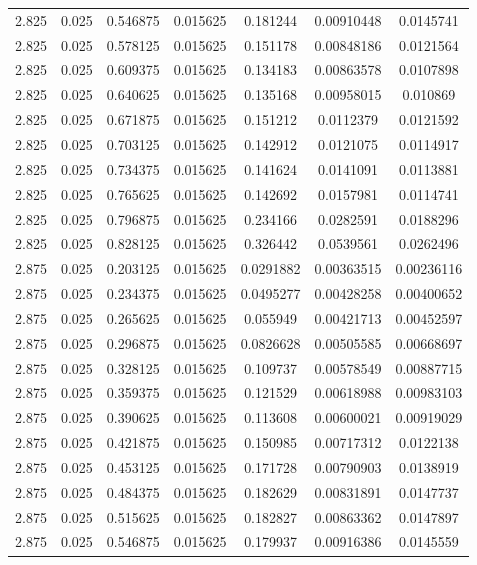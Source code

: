 \begin{table}[bh]
\begin{center}
{\begin{tabular}{ccccccc}
2.825	 & 0.025 & 	0.546875	 & 0.015625	 & 0.181244	 & 0.00910448	 & 0.0145741 \\ 
2.825	 & 0.025 & 	0.578125	 & 0.015625	 & 0.151178	 & 0.00848186	 & 0.0121564 \\ 
2.825	 & 0.025 & 	0.609375	 & 0.015625	 & 0.134183	 & 0.00863578	 & 0.0107898 \\ 
2.825	 & 0.025 & 	0.640625	 & 0.015625	 & 0.135168	 & 0.00958015	 & 0.010869 \\ 
2.825	 & 0.025 & 	0.671875	 & 0.015625	 & 0.151212	 & 0.0112379	 & 0.0121592 \\ 
2.825	 & 0.025 & 	0.703125	 & 0.015625	 & 0.142912	 & 0.0121075	 & 0.0114917 \\ 
2.825	 & 0.025 & 	0.734375	 & 0.015625	 & 0.141624	 & 0.0141091	 & 0.0113881 \\ 
2.825	 & 0.025 & 	0.765625	 & 0.015625	 & 0.142692	 & 0.0157981	 & 0.0114741 \\ 
2.825	 & 0.025 & 	0.796875	 & 0.015625	 & 0.234166	 & 0.0282591	 & 0.0188296 \\ 
2.825	 & 0.025 & 	0.828125	 & 0.015625	 & 0.326442	 & 0.0539561	 & 0.0262496 \\ 
2.875	 & 0.025 & 	0.203125	 & 0.015625	 & 0.0291882	 & 0.00363515	 & 0.00236116 \\ 
2.875	 & 0.025 & 	0.234375	 & 0.015625	 & 0.0495277	 & 0.00428258	 & 0.00400652 \\ 
2.875	 & 0.025 & 	0.265625	 & 0.015625	 & 0.055949	 & 0.00421713	 & 0.00452597 \\ 
2.875	 & 0.025 & 	0.296875	 & 0.015625	 & 0.0826628	 & 0.00505585	 & 0.00668697 \\ 
2.875	 & 0.025 & 	0.328125	 & 0.015625	 & 0.109737	 & 0.00578549	 & 0.00887715 \\ 
2.875	 & 0.025 & 	0.359375	 & 0.015625	 & 0.121529	 & 0.00618988	 & 0.00983103 \\ 
2.875	 & 0.025 & 	0.390625	 & 0.015625	 & 0.113608	 & 0.00600021	 & 0.00919029 \\ 
2.875	 & 0.025 & 	0.421875	 & 0.015625	 & 0.150985	 & 0.00717312	 & 0.0122138 \\ 
2.875	 & 0.025 & 	0.453125	 & 0.015625	 & 0.171728	 & 0.00790903	 & 0.0138919 \\ 
2.875	 & 0.025 & 	0.484375	 & 0.015625	 & 0.182629	 & 0.00831891	 & 0.0147737 \\ 
2.875	 & 0.025 & 	0.515625	 & 0.015625	 & 0.182827	 & 0.00863362	 & 0.0147897 \\ 
2.875	 & 0.025 & 	0.546875	 & 0.015625	 & 0.179937	 & 0.00916386	 & 0.0145559 \\ 

\end{tabular}}
\end{center}
\end{table}

